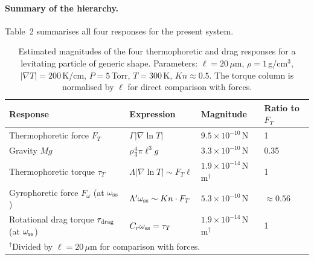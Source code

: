 \documentclass[11pt]{article}
\begin{document}
\paragraph{Summary of the hierarchy.} Table~2 summarises all four responses for the present system.

\begin{table}[h]
\centering
\caption{Estimated magnitudes of the four thermophoretic and drag responses for a levitating particle of generic shape. Parameters: $\ell=20\,\mu$m, $\rho=1\,$g/cm$^3$, $|\nabla T|=200\,$K/cm, $P=5\,$Torr, $T=300\,$K, $Kn\approx0.5$. The torque column is normalised by $\ell$ for direct comparison with forces.}
\begin{tabular}{llll}
\toprule
Response & Expression & Magnitude & Ratio to $F_T$\\
\midrule
Thermophoretic force $F_T$ & $\Gamma|\nabla\ln T|$ & $9.5\times10^{-10}\,$N & 1\\
Gravity $Mg$ & $\rho\frac43\pi\ell^3g$ & $3.3\times10^{-10}\,$N & 0.35\\
Thermophoretic torque $\tau_T$ & $\Lambda|\nabla\ln T|\sim F_T\ell$ & $1.9\times10^{-14}\,$N\,m$^\dagger$ & 1\\
Gyrophoretic force $F_\omega$ (at $\omega_{\rm ss}$) & $\Lambda'\omega_{\rm ss}\sim Kn\cdot F_T$ & $5.3\times10^{-10}\,$N & $\approx0.56$\\
Rotational drag torque $\tau_{\rm drag}$ (at $\omega_{\rm ss}$) & $C_r\omega_{\rm ss}=\tau_T$ & $1.9\times10^{-14}\,$N\,m$^\dagger$ & 1\\
\bottomrule
\multicolumn{4}{l}{\footnotesize $^\dagger$Divided by $\ell=20\,\mu$m for comparison with forces.}
\end{tabular}
\end{table}
\end{document}
